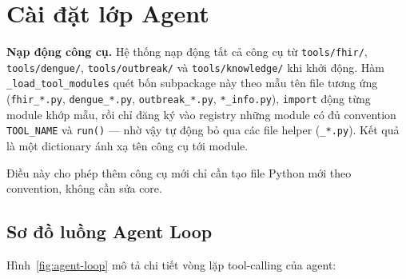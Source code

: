 \documentclass[a4paper,13pt,3p,twoside,openany]{report}
\theoremstyle{definition}
\theoremstyle{remark}
\theoremstyle{definition}
\let\ORIGsection\section
\let\ORIGsubsection\subsection
\renewcommand{\section}{\needspace{3\baselineskip}\ORIGsection}
\renewcommand{\subsection}{\needspace{3\baselineskip}\ORIGsubsection}
\begin{document}
\section{Cài đặt lớp Agent}

\textbf{Nạp động công cụ.} Hệ thống nạp động tất cả công cụ từ \texttt{tools/fhir/}, \texttt{tools/dengue/}, \texttt{tools/outbreak/} và \texttt{tools/knowledge/} khi khởi động. Hàm \texttt{\_load\_tool\_modules} quét bốn subpackage này theo mẫu tên file tương ứng (\texttt{fhir\_*.py}, \texttt{dengue\_*.py}, \texttt{outbreak\_*.py}, \texttt{*\_info.py}), \texttt{import} động từng module khớp mẫu, rồi chỉ đăng ký vào registry những module có đủ convention \texttt{TOOL\_NAME} và \texttt{run()} --- nhờ vậy tự động bỏ qua các file helper (\texttt{\_*.py}). Kết quả là một dictionary ánh xạ tên công cụ tới module.

Điều này cho phép thêm công cụ mới chỉ cần tạo file Python mới theo convention, không cần sửa core.

\subsection{Sơ đồ luồng Agent Loop}

Hình~\ref{fig:agent-loop} mô tả chi tiết vòng lặp tool-calling của agent:
\end{document}
